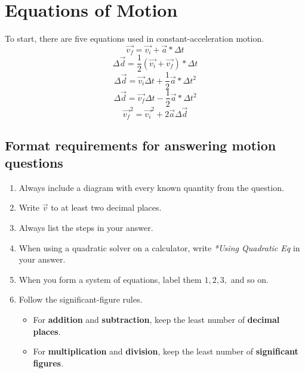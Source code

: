 \section{Equations of Motion}
To start, there are five equations used in constant-acceleration motion.
\[
    \vec{v_{f}} = \vec{v_{i}} + \vec{a}*\Delta t
\]
\[
    \Delta\vec{d} = \frac{1}{2}(\vec{v_{i}} + \vec{v_{f}}) * \Delta t
\]
\[
    \Delta\vec{d} = \vec{v_{i}}\Delta t + \frac{1}{2}\vec{a} * \Delta t^2
\]
\[
    \Delta\vec{d} = \vec{v_{f}}\Delta t - \frac{1}{2}\vec{a} * \Delta t^2
\]
\[
    \vec{v_{f}}^2 = \vec{v_{i}}^2 + 2 \vec{a} \Delta \vec{d} 
\]

\subsection{Format requirements for answering motion questions}
\begin{enumerate}
    \item Always include a diagram with every known quantity from the question.
    \item Write $\vec{v}$ to at least two decimal places.
    \item Always list the steps in your answer.
    \item When using a quadratic solver on a calculator, write \textit{*Using Quadratic Eq} in your answer.
    \item When you form a system of equations, label them $1, 2, 3,$ and so on.
    \item Follow the significant-figure rules.
    \begin{itemize}
        \item[!] For \textbf{addition} and \textbf{subtraction}, keep the least number of \textbf{decimal places}.
        \item[!] For \textbf{multiplication} and \textbf{division}, keep the least number of \textbf{significant figures}.
    \end{itemize}
\end{enumerate}
